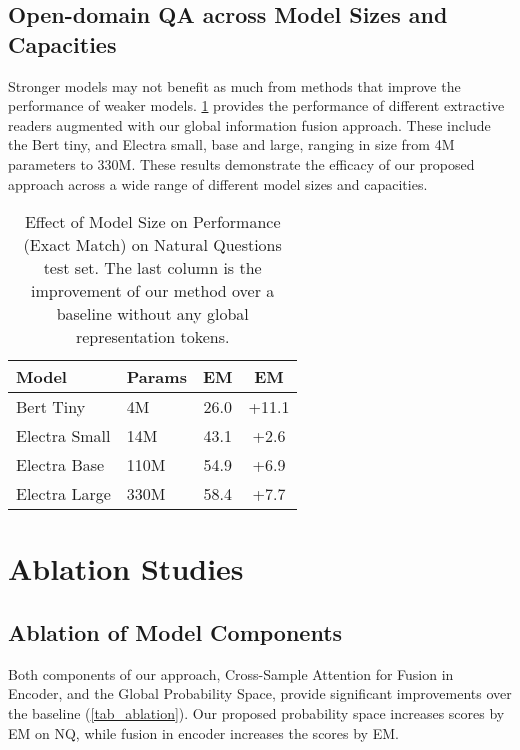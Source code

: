 \documentclass[11pt]{article}
\begin{document}
\subsection{Open-domain QA across Model Sizes and Capacities}

Stronger models may not benefit as much from methods that improve the performance of weaker models. \cref{tab_abl_size} provides the performance of different extractive readers augmented with our global information fusion approach. These include the Bert \cite{devlin-etal-2019-bert} tiny, and Electra \cite{clark2020electra} small, base and large, ranging in size from 4M parameters to 330M. These results demonstrate the efficacy of our proposed approach across a wide range of different model sizes and capacities.

\begin{table}[h!]
\begin{center}
\begin{tabular}{llcc}
\toprule
\textbf{Model} & \textbf{Params} & \textbf{EM} & \textbf{ EM}\\ 
\toprule
Bert Tiny & 4M & 26.0 & +11.1 \\
Electra Small & 14M & 43.1 & +2.6 \\
Electra Base & 110M & 54.9 & +6.9 \\
Electra Large & 330M & 58.4 & +7.7 \\
\bottomrule
\end{tabular}
\end{center}
\caption{Effect of Model Size on Performance (Exact Match) on Natural Questions test set. The last column is the improvement of our method over a baseline without any global representation tokens.}
\label{tab_abl_size}
\end{table}


 \section{Ablation Studies}


\subsection{Ablation of Model Components}

Both components of our approach, Cross-Sample Attention for Fusion in Encoder, and the Global Probability Space, provide significant improvements over the baseline (\cref{tab_ablation}). Our proposed probability space increases scores by  EM on NQ, while fusion in encoder increases the scores by  EM. 
\end{document}
